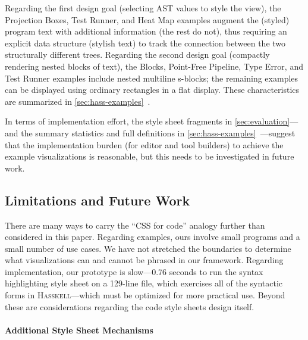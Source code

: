 \documentclass[acmsmall, screen]{acmart}
\newcommand{\parahead}[1]
  {\paragraph{\textbf{#1}}}
\newcommand{\refAppendixHassExamples}
  {\autoref{sec:hass-examples}~\cite{Hass}}
\newcommand{\hasskell}
{\textsc{Hasskell}}
\begin{document}
Regarding the first design goal (selecting AST values to style the view), the Projection Boxes, Test Runner, and Heat Map examples augment the (styled) program text with additional information (the rest do not), thus requiring an explicit data structure (stylish text) to track the connection between the two structurally different trees.
Regarding the second design goal (compactly rendering nested blocks of text), the Blocks, Point-Free Pipeline, Type Error, and Test Runner examples include nested multiline s-blocks; the remaining examples can be displayed using ordinary rectangles in a flat display.
These characteristics are summarized in \refAppendixHassExamples{}.



In terms of implementation effort, the style sheet fragments in \autoref{sec:evaluation}---and the summary statistics and full definitions in \refAppendixHassExamples{}---suggest that the implementation burden (for editor and tool builders) to achieve the example visualizations is reasonable,
but this needs to be investigated in future work.

\subsection{Limitations and Future Work}
\label{sec:limitations}

There are many ways to carry the ``CSS for code'' analogy further than considered in this paper.
Regarding examples, ours involve small programs and a small number of use cases.
We have not stretched the boundaries to determine what visualizations can and cannot be phrased in our framework.
Regarding implementation, our prototype is slow---0.76 seconds to run the syntax highlighting style sheet on a 129-line file, which exercises all of the syntactic forms in \hasskell{}---which must be optimized for more practical use.
Beyond these are considerations regarding the code style sheets design itself.



\parahead{Additional Style Sheet Mechanisms}
\end{document}
